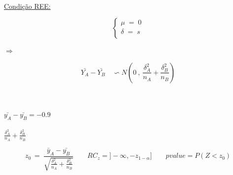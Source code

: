 \\
\hspace*{5cm} \underline{Condição REE:}\\
\begin{minipage}[l]{0pt}
$$\left\lbrace\begin{array}{c}
\mu \;=\; 0 \\
\delta \;=\; s \\
\end{array}\right.$$
\end{minipage}
\hspace{3cm} $\Longrightarrow$ \hspace{1cm}
\begin{minipage}[l]{0pt}
\[\bar{Y_A}-\bar{Y_B} \quad \backsim N \left( 0\:,\: \frac{\delta_A^2}{n_A}+\frac{\delta_B^2}{n_B} \right) \]
\end{minipage}\\
\\
$ \bar{y_A}-\bar{y_B}=-0.9$\\
\\
$ \frac{\delta_A^2}{n_A}+\frac{\delta_B^2}{n_B} $\\
\begin{minipage}[l]{0pt}
\[  z_0\:=\: \frac{\bar{y}_A-\bar{y_B}}{\sqrt{\frac{\delta_A^2}{n_A}+\frac{\delta_B^2}{n_B}}} \qquad
 	RC_z=]-\infty,-z_{1-\alpha}] \qquad
 	pvalue=P(Z<z_0) \]
\end{minipage}\\
\\










\newpage
